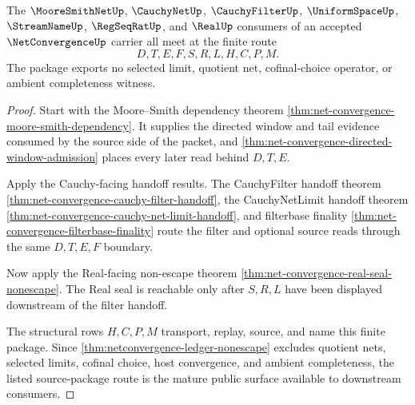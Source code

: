 \begin{theorem}
\label{thm:net-convergence-mature-source-package}
The $\MooreSmithNetUp$, $\CauchyNetUp$, $\CauchyFilterUp$, $\UniformSpaceUp$, $\StreamNameUp$, $\RegSeqRatUp$, and $\RealUp$ consumers of an accepted $\NetConvergenceUp$ carrier all meet at the finite route
$$
D,T,E,F,S,R,L,H,C,P,M .
$$
The package exports no selected limit, quotient net, cofinal-choice operator, or ambient completeness witness.
\end{theorem}
\begin{proof}
Start with the Moore--Smith dependency theorem \autoref{thm:net-convergence-moore-smith-dependency}. It supplies the directed window and tail evidence consumed by the source side of the packet, and \autoref{thm:net-convergence-directed-window-admission} places every later read behind $D,T,E$.

Apply the Cauchy-facing handoff results. The CauchyFilter handoff theorem \autoref{thm:net-convergence-cauchy-filter-handoff}, the CauchyNetLimit handoff theorem \autoref{thm:net-convergence-cauchy-net-limit-handoff}, and filterbase finality \autoref{thm:net-convergence-filterbase-finality} route the filter and optional source reads through the same $D,T,E,F$ boundary.

Now apply the Real-facing non-escape theorem \autoref{thm:net-convergence-real-seal-nonescape}. The Real seal is reachable only after $S,R,L$ have been displayed downstream of the filter handoff.

The structural rows $H,C,P,M$ transport, replay, source, and name this finite package. Since \autoref{thm:netconvergence-ledger-nonescape} excludes quotient nets, selected limits, cofinal choice, host convergence, and ambient completeness, the listed source-package route is the mature public surface available to downstream consumers.
\end{proof}


